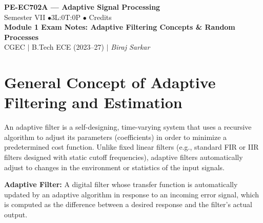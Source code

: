 \documentclass[12pt,a4paper]{article}
\begin{document}

\begin{center}
  {\LARGE\bfseries\color{myred} PE-EC702A --- Adaptive Signal Processing}\\[5pt]
  {\normalsize\color{mydark} Semester VII \quad$\bullet$\quad 3L:0T:0P \quad$\bullet$ Credits}\\[3pt]
  {\normalsize\color{myteal}\textbf{Module 1 Exam Notes: Adaptive Filtering Concepts \& Random Processes}}\\[3pt]
  {\small\color{mydark} CGEC \;$|$\; B.Tech ECE (2023--27) \;$|$\; \textit{Biraj Sarkar}}
\end{center}
\vspace{2pt}
\noindent{\color{myred}\rule{\linewidth}{1.5pt}}
\vspace{2pt}

\hypersetup{linkcolor=mydark}
\tableofcontents
\hypersetup{linkcolor=myteal}
\newpage

\section{General Concept of Adaptive Filtering and Estimation}

An adaptive filter is a self-designing, time-varying system that uses a recursive algorithm to adjust its parameters (coefficients) in order to minimize a predetermined cost function. Unlike fixed linear filters (e.g., standard FIR or IIR filters designed with static cutoff frequencies), adaptive filters automatically adjust to changes in the environment or statistics of the input signals.

\begin{tcolorbox}[defbox]
\textbf{Adaptive Filter:} A digital filter whose transfer function is automatically updated by an adaptive algorithm in response to an incoming error signal, which is computed as the difference between a desired response and the filter's actual output.
\end{tcolorbox}
\end{document}
